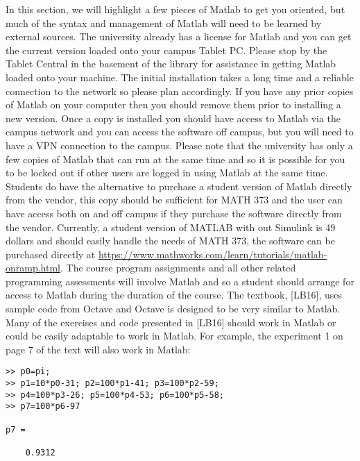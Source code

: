 \documentclass[twoside]{article}
\renewcommand{\cite}[1]{[#1]}
\begin{document}
In this section, we will highlight a few pieces of Matlab to get you oriented, but much of the syntax and management of Matlab will need to be learned by external sources. The university already has a license for Matlab and you can get the current version loaded onto your campus Tablet PC. Please stop by the Tablet Central in the basement of the library for assistance in getting Matlab loaded onto your machine. The initial installation takes a long time and a reliable connection to the network so please plan accordingly. If  you have any prior copies of Matlab on your computer then you should remove them prior to installing a new version. Once a copy is installed you should have access to Matlab via the campus network and you can access the software off campus, but you will need to have a VPN connection to the campus.  Please note that the university has only a few copies of Matlab that can run at the same time and so it is possible for you to be locked out if other users are logged in using Matlab at the same time. Students do have the alternative to purchase a student version of Matlab directly from the vendor, this copy should be sufficient for MATH 373 and the user can have access both on and off campus if they purchase the software directly from the vendor. Currently, a student version of MATLAB with out Simulink is 49 dollars and should easily handle the needs of MATH 373, the software can be purchased directly at \href{https://www.mathworks.com/}{https://www.mathworks.com/learn/tutorials/matlab-onramp.html}. The course program assignments and all other related programming assessments will involve Matlab and so a student should arrange for access to Matlab during the duration of the course.  The textbook, \cite{LB16}, uses sample code from Octave and Octave is designed to be very similar to Matlab.  Many of the exercises and code presented in \cite{LB16} should work in Matlab or could be easily adaptable to work in Matlab. For example, the experiment 1 on page 7 of the text will also work in Matlab: 

\begin{verbatim}
>> p0=pi;
>> p1=10*p0-31; p2=100*p1-41; p3=100*p2-59;
>> p4=100*p3-26; p5=100*p4-53; p6=100*p5-58;
>> p7=100*p6-97

p7 =

    0.9312
\end{verbatim}
\end{document}
